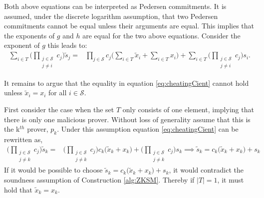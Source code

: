 Both above equations can be interpreted as Pedersen commitments.  It is assumed, under the discrete logarithm assumption, that two Pedersen commitments cannot be equal unless their arguments are equal. This implies that the exponents of $g$ and $h$ are equal for the two above equations. Consider the exponent of $g$ this leads to:
\begin{align}
\label{eq:cheatingCient}
\sum_{i\in T} \big(\prod_{\substack{j\in\mathcal{S}\\ j\neq i}} c_j \big) \tilde{s}_j =& \prod_{j\in\mathcal{S}} c_j \big(\sum_{i\in T} \tilde{x}_i + \sum_{i\in T} x_i\big) + \sum_{i\in T} \big( \prod_{\substack{j\in\mathcal{S}\\ j\neq i}} c_j\big) s_i  . 
\end{align}

It remains to argue that the equality in equation \eqref{eq:cheatingCient} cannot hold unless $\tilde{x}_i= x_i$ for all $i\in\mathcal{S}$.

First consider the case when the set $T$ only consists of one element, implying that there is only one malicious prover. Without loss of generality assume that this is the k$^{th}$ prover, $p_k$. Under this assumption equation \eqref{eq:cheatingCient} can be rewritten as, 
\begin{align*}
\big(\prod_{\substack{j\in\mathcal{S}\\ j\neq k}} c_j \big)  \tilde{s}_k  =& \big ( \prod_{\substack{j\in\mathcal{S}\\ j\neq k}} c_j \big)c_k \big( \tilde{x}_k + x_k\big) +\big( \prod_{\substack{j\in\mathcal{S}\\ j\neq k}} c_j\big) s_k  \implies   \tilde{s}_k  = c_k \big( \tilde{x}_k + x_k\big) + s_k
\end{align*}
If it would be possible to choose $\tilde{s}_k = c_k \big( \tilde{x}_k + x_k\big) + s_k $, it would contradict the soundness assumption of Construction \ref{alg:ZKSM}. Thereby if $|T|=1$, it must hold that $\tilde{x}_k=x_k$.

